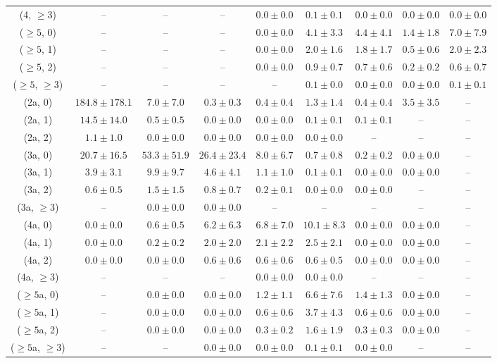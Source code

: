 \begin{table}[h!]
{\begin{tabular}{ccccccccc}
	(4, $\ge3$) & -- & -- & -- & $0.0\pm 0.0$ & $0.1\pm 0.1$ & $0.0\pm 0.0$ & $0.0\pm 0.0$ & $0.0\pm 0.0$ \\[0.5ex] 
	($\ge5$, 0) & -- & -- & -- & $0.0\pm 0.0$ & $4.1\pm 3.3$ & $4.4\pm 4.1$ & $1.4\pm 1.8$ & $7.0\pm 7.9$ \\[0.5ex] 
	($\ge5$, 1) & -- & -- & -- & $0.0\pm 0.0$ & $2.0\pm 1.6$ & $1.8\pm 1.7$ & $0.5\pm 0.6$ & $2.0\pm 2.3$ \\[0.5ex] 
	($\ge5$, 2) & -- & -- & -- & $0.0\pm 0.0$ & $0.9\pm 0.7$ & $0.7\pm 0.6$ & $0.2\pm 0.2$ & $0.6\pm 0.7$ \\[0.5ex] 
	($\ge5$, $\ge3$) & -- & -- & -- & -- & $0.1\pm 0.0$ & $0.0\pm 0.0$ & $0.0\pm 0.0$ & $0.1\pm 0.1$ \\[0.5ex] 
	(2a, 0) & $184.8\pm 178.1$ & $7.0\pm 7.0$ & $0.3\pm 0.3$ & $0.4\pm 0.4$ & $1.3\pm 1.4$ & $0.4\pm 0.4$ & $3.5\pm 3.5$ & -- \\[0.5ex] 
	(2a, 1) & $14.5\pm 14.0$ & $0.5\pm 0.5$ & $0.0\pm 0.0$ & $0.0\pm 0.0$ & $0.1\pm 0.1$ & $0.1\pm 0.1$ & -- & -- \\[0.5ex] 
	(2a, 2) & $1.1\pm 1.0$ & $0.0\pm 0.0$ & $0.0\pm 0.0$ & $0.0\pm 0.0$ & $0.0\pm 0.0$ & -- & -- & -- \\[0.5ex] 
	(3a, 0) & $20.7\pm 16.5$ & $53.3\pm 51.9$ & $26.4\pm 23.4$ & $8.0\pm 6.7$ & $0.7\pm 0.8$ & $0.2\pm 0.2$ & $0.0\pm 0.0$ & -- \\[0.5ex] 
	(3a, 1) & $3.9\pm 3.1$ & $9.9\pm 9.7$ & $4.6\pm 4.1$ & $1.1\pm 1.0$ & $0.1\pm 0.1$ & $0.0\pm 0.0$ & $0.0\pm 0.0$ & -- \\[0.5ex] 
	(3a, 2) & $0.6\pm 0.5$ & $1.5\pm 1.5$ & $0.8\pm 0.7$ & $0.2\pm 0.1$ & $0.0\pm 0.0$ & $0.0\pm 0.0$ & -- & -- \\[0.5ex] 
	(3a, $\ge3$) & -- & $0.0\pm 0.0$ & $0.0\pm 0.0$ & -- & -- & -- & -- & -- \\[0.5ex] 
	(4a, 0) & $0.0\pm 0.0$ & $0.6\pm 0.5$ & $6.2\pm 6.3$ & $6.8\pm 7.0$ & $10.1\pm 8.3$ & $0.0\pm 0.0$ & $0.0\pm 0.0$ & -- \\[0.5ex] 
	(4a, 1) & $0.0\pm 0.0$ & $0.2\pm 0.2$ & $2.0\pm 2.0$ & $2.1\pm 2.2$ & $2.5\pm 2.1$ & $0.0\pm 0.0$ & $0.0\pm 0.0$ & -- \\[0.5ex] 
	(4a, 2) & $0.0\pm 0.0$ & $0.0\pm 0.0$ & $0.6\pm 0.6$ & $0.6\pm 0.6$ & $0.6\pm 0.5$ & $0.0\pm 0.0$ & $0.0\pm 0.0$ & -- \\[0.5ex] 
	(4a, $\ge3$) & -- & -- & -- & $0.0\pm 0.0$ & $0.0\pm 0.0$ & -- & -- & -- \\[0.5ex] 
	($\ge5$a, 0) & -- & $0.0\pm 0.0$ & $0.0\pm 0.0$ & $1.2\pm 1.1$ & $6.6\pm 7.6$ & $1.4\pm 1.3$ & $0.0\pm 0.0$ & -- \\[0.5ex] 
	($\ge5$a, 1) & -- & $0.0\pm 0.0$ & $0.0\pm 0.0$ & $0.6\pm 0.6$ & $3.7\pm 4.3$ & $0.6\pm 0.6$ & $0.0\pm 0.0$ & -- \\[0.5ex] 
	($\ge5$a, 2) & -- & $0.0\pm 0.0$ & $0.0\pm 0.0$ & $0.3\pm 0.2$ & $1.6\pm 1.9$ & $0.3\pm 0.3$ & $0.0\pm 0.0$ & -- \\[0.5ex] 
	($\ge5$a, $\ge3$) & -- & -- & $0.0\pm 0.0$ & $0.0\pm 0.0$ & $0.1\pm 0.1$ & $0.0\pm 0.0$ & -- & -- \\[0.5ex] 
	\hline
	\hline
\end{tabular}}
\end{table}
